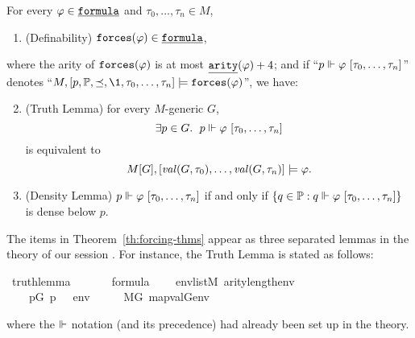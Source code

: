\begin{theorem}\label{th:forcing-thms}
  For every
  $\phi\in\formula$ and $\tau_0,\dots,\tau_n\in M$,
  \begin{enumerate}
  \item\label{item:definability} (Definability)
    $\forceisa(\phi)\in\formula$, 
  \end{enumerate}
  where the 
  arity of $\mathop{\mathtt{forces}}(\varphi)$ is at most $\isatt{arity}(\phi) + 4$; and if
  “$p \forces \phi\ [\tau_0,\dots,\tau_n]$”
  denotes
  “$M, [p,\PP,\preceq,\1, \tau_0,\dots,\tau_n]  \models
  \forceisa(\phi)$”, we have:
  \begin{enumerate}
    \setcounter{enumi}{1}
  \item\label{item:truth-lemma} (Truth Lemma) for every $M$-generic $G$,
    \[
      \exists p\in G.\ \; p \forces \phi\ [\tau_0,\dots,\tau_n]
    \]
    is equivalent to 
    \[
      M[G], [\operatorname{\mathit{val}}(G,\tau_0),\dots,\operatorname{\mathit{val}}(G,\tau_n)]
      \models \varphi.
    \]
  \item \label{item:density-lemma} (Density Lemma) $p \forces \phi\ [\tau_0,\dots,\tau_n]$
    if and only if 
    $\{q\in \PP :  q \forces \phi\ [\tau_0,\dots,\tau_n]\}$
    is dense below $p$.
  \end{enumerate}
\end{theorem}
The items in Theorem~\ref{th:forcing-thms} appear as three
separated lemmas in the theory
 of our
 session \cite{Independence_CH-AFP}.
For instance, the Truth Lemma is stated as
follows:
\begin{isabelle}
\isamarkupfalse%
\ truth{\isacharunderscore}{\kern0pt}lemma{\isacharcolon}{\kern0pt}\isanewline
\ \ \isanewline
\ \ \ \ {\isachardoublequoteopen}{\isasymphi}{\isasymin}formula{\isachardoublequoteclose}\isanewline
\ \ \ \ {\isachardoublequoteopen}env{\isasymin}list{\isacharparenleft}{\kern0pt}M{\isacharparenright}{\kern0pt}{\isachardoublequoteclose}\ {\isachardoublequoteopen}arity{\isacharparenleft}{\kern0pt}{\isasymphi}{\isacharparenright}{\kern0pt}{\isasymle}length{\isacharparenleft}{\kern0pt}env{\isacharparenright}{\kern0pt}{\isachardoublequoteclose}\isanewline
\ \ \isanewline
\ \ \ \ {\isachardoublequoteopen}{\isacharparenleft}{\kern0pt}{\isasymexists}p{\isasymin}G{\isachardot}{\kern0pt}\ p\ {\isasymtturnstile}\ {\isasymphi}\ env{\isacharparenright}{\kern0pt}\ \ \ {\isasymlongleftrightarrow}\ \ \ M{\isacharbrackleft}{\kern0pt}G{\isacharbrackright}{\kern0pt}{\isacharcomma}{\kern0pt}\ map{\isacharparenleft}{\kern0pt}val{\isacharparenleft}{\kern0pt}G{\isacharparenright}{\kern0pt}{\isacharcomma}{\kern0pt}env{\isacharparenright}{\kern0pt}\ {\isasymTurnstile}\ {\isasymphi}{\isachardoublequoteclose}
\end{isabelle}
where the $\Vdash$ notation (and its precedence) had already been set up in the
 theory.


